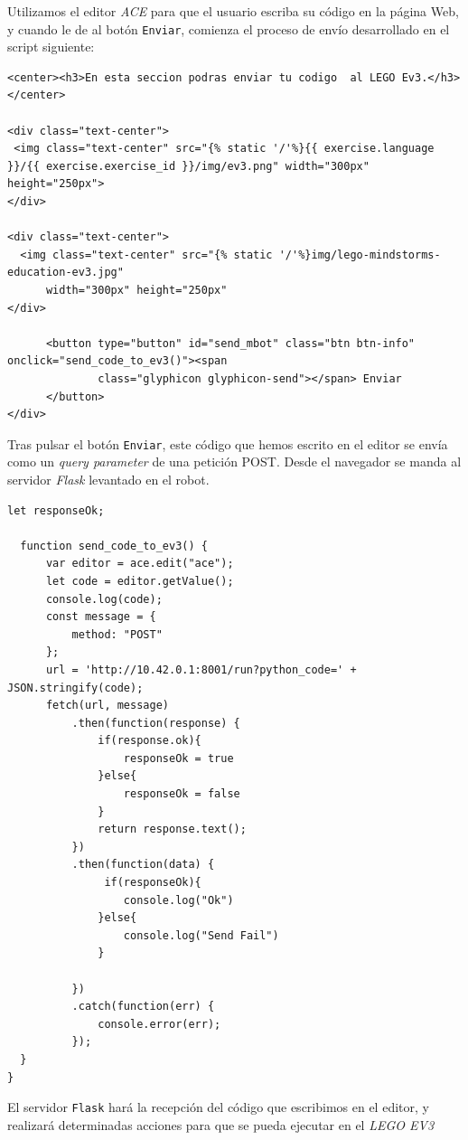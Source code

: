 Utilizamos el editor \textit{ACE} para que el usuario escriba su código en la página Web, y cuando le de al botón \texttt{Enviar}, comienza el proceso de envío desarrollado en el script siguiente:
\\
\begin{lstlisting}[frame=single,breaklines=true, label=Función de envío del código al servidor, caption=Función de envío del código al servidor captionpos=b] <center><h3>En esta seccion podras enviar tu codigo  al LEGO Ev3.</h3></center>

<div class="text-center">
 <img class="text-center" src="{% static '/'%}{{ exercise.language }}/{{ exercise.exercise_id }}/img/ev3.png" width="300px" height="250px">
</div>

<div class="text-center">
  <img class="text-center" src="{% static '/'%}img/lego-mindstorms-education-ev3.jpg"
      width="300px" height="250px"
</div>

      <button type="button" id="send_mbot" class="btn btn-info" onclick="send_code_to_ev3()"><span
              class="glyphicon glyphicon-send"></span> Enviar
      </button>
</div>
\end{lstlisting}
Tras pulsar el botón \texttt{Enviar}, este código que hemos escrito en el editor se envía como un \textit{query parameter} de una petición POST. Desde el navegador se manda al servidor \textit{Flask} levantado en el robot. 
\\
\begin{lstlisting}[frame=single,breaklines=true, label=Función de envío del código al servidor, caption=Función de envío del código al servidor,  captionpos=b]
let responseOk;

  function send_code_to_ev3() {
      var editor = ace.edit("ace");
      let code = editor.getValue();
      console.log(code);
      const message = {
          method: "POST"
      };
      url = 'http://10.42.0.1:8001/run?python_code=' + JSON.stringify(code);
      fetch(url, message)
          .then(function(response) {
              if(response.ok){
                  responseOk = true
              }else{
                  responseOk = false
              }
              return response.text();
          })
          .then(function(data) {
               if(responseOk){
                  console.log("Ok")
              }else{
                  console.log("Send Fail")
              }

          })
          .catch(function(err) {
              console.error(err);
          });
  }
}
\end{lstlisting}
El servidor \texttt{Flask} hará la recepción del código que escribimos en el editor, y realizará determinadas acciones para que se pueda ejecutar en el \textit{LEGO EV3}


